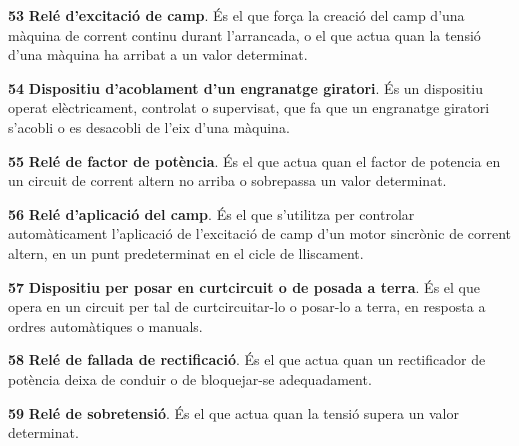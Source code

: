 \begin{multicols}{2}
\begin{list}{}
\item[\textbf{53}]  
\textbf{Rel\'{e} d'excitaci\'{o} de camp}. \'{E}s el
que for\c{c}a la creaci\'{o} del camp d'una m\`{a}quina de corrent continu
durant l'arrancada, o el que actua quan la tensi\'{o} d'una m\`{a}quina ha
arribat a un valor determinat.

\item[\textbf{54}]  
\textbf{Dispositiu d'acoblament d'un engranatge giratori}. \'{E}s un dispositiu operat el\`{e}ctricament, controlat o supervisat, que fa que un engranatge giratori
s'acobli o es desacobli de l'eix d'una m\`{a}quina.

\item[\textbf{55}]   
\textbf{Rel\'{e} de factor de pot\`{e}ncia}.
\'{E}s el que actua quan el factor de potencia en un circuit de corrent altern no arriba o
sobrepassa un valor determinat.

\item[\textbf{56}]   
\textbf{Rel\'{e} d'aplicaci\'{o} del camp}.
\'{E}s el que s'utilitza per controlar autom\`{a}ticament l'aplicaci\'{o} de l'excitaci\'{o} de camp d'un
motor sincr\`{o}nic de corrent altern, en un punt predeterminat en el cicle de lliscament.

\item[\textbf{57}]  
\textbf{Dispositiu per posar en  curtcircuit o de posada a terra}. \'{E}s el que
opera en un circuit per tal de curtcircuitar-lo  o
posar-lo a terra, en resposta a ordres autom\`{a}tiques o manuals.

\item[\textbf{58}]   
\textbf{Rel\'{e} de fallada de rectificaci\'{o}}. \'{E}s el que actua quan un rectificador de pot\`{e}ncia deixa de conduir o de bloquejar-se adequadament.

\item[\textbf{59}]   
\textbf{Rel\'{e} de sobretensi\'{o}}. \'{E}s el que
actua quan la tensi\'{o} supera un valor determinat.


\end{list}
\end{multicols}
